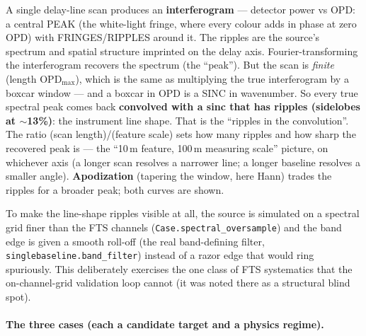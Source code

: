 \documentclass[11pt]{article}
\newcommand{\code}[1]{\texttt{\small #1}}
\begin{document}
\begin{physicsbox}[title={\textsc{Peak, ripples, convolution: the FTS picture
at one baseline}}]
A single delay-line scan produces an \textbf{interferogram} --- detector power
vs OPD: a central PEAK (the white-light fringe, where every colour adds in
phase at zero OPD) with FRINGES/RIPPLES around it. The ripples are the
source's spectrum and spatial structure imprinted on the delay axis.
Fourier-transforming the interferogram recovers the spectrum (the
``peak''). But the scan is \emph{finite} (length OPD$_{\max}$), which is the
same as multiplying the true interferogram by a boxcar window --- and a
boxcar in OPD is a SINC in wavenumber. So every true spectral peak comes back
\textbf{convolved with a sinc that has ripples (sidelobes at $\sim$13\%)}:
the instrument line shape. That is the ``ripples in the convolution''. The
ratio (scan length)/(feature scale) sets how many ripples and how sharp the
recovered peak is --- the ``10\,m feature, 100\,m measuring scale'' picture,
on whichever axis (a longer scan resolves a narrower line; a longer baseline
resolves a smaller angle). \textbf{Apodization} (tapering the window, here
Hann) trades the ripples for a broader peak; both curves are shown.
\end{physicsbox}

To make the line-shape ripples visible at all, the source is simulated on a
spectral grid finer than the FTS channels (\code{Case.spectral\_oversample})
and the band edge is given a smooth roll-off (the real band-defining filter,
\code{singlebaseline.band\_filter}) instead of a razor edge that would ring
spuriously. This deliberately exercises the one class of FTS systematics that
the on-channel-grid validation loop cannot (it was noted there as a
structural blind spot).

\paragraph{The three cases (each a candidate target and a physics regime).}
\end{document}

